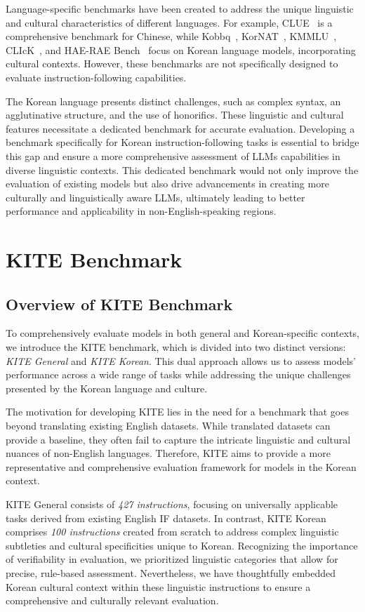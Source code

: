     Language-specific benchmarks have been created to address the unique linguistic and cultural characteristics of different languages. For example, CLUE~\cite{xu2020clue} is a comprehensive benchmark for Chinese, while Kobbq~\cite{jin2023kobbq}, KorNAT~\cite{lee2024kornat}, KMMLU~\cite{son2024kmmlu}, CLIcK~\cite{kim2024click}, and HAE-RAE Bench~\cite{son2023hae} focus on Korean language models, incorporating cultural contexts. However, these benchmarks are not specifically designed to evaluate instruction-following capabilities.

    The Korean language presents distinct challenges, such as complex syntax, an agglutinative structure, and the use of honorifics. These linguistic and cultural features necessitate a dedicated benchmark for accurate evaluation. Developing a benchmark specifically for Korean instruction-following tasks is essential to bridge this gap and ensure a more comprehensive assessment of LLMs capabilities in diverse linguistic contexts. This dedicated benchmark would not only improve the evaluation of existing models but also drive advancements in creating more culturally and linguistically aware LLMs, ultimately leading to better performance and applicability in non-English-speaking regions.

    \section{KITE Benchmark}
    \subsection{Overview of KITE Benchmark}
    To comprehensively evaluate models in both general and Korean-specific contexts, we introduce the KITE benchmark, which is divided into two distinct versions: \textit{KITE General} and \textit{KITE Korean}. This dual approach allows us to assess models' performance across a wide range of tasks while addressing the unique challenges presented by the Korean language and culture.

    The motivation for developing KITE lies in the need for a benchmark that goes beyond translating existing English datasets. While translated datasets can provide a baseline, they often fail to capture the intricate linguistic and cultural nuances of non-English languages. Therefore, KITE aims to provide a more representative and comprehensive evaluation framework for models in the Korean context.

    KITE General consists of \textit{427 instructions}, focusing on universally applicable tasks derived from existing English IF datasets. In contrast, KITE Korean comprises \textit{100 instructions} created from scratch to address complex linguistic subtleties and cultural specificities unique to Korean. Recognizing the importance of verifiability in evaluation, we prioritized linguistic categories that allow for precise, rule-based assessment. Nevertheless, we have thoughtfully embedded Korean cultural context within these linguistic instructions to ensure a comprehensive and culturally relevant evaluation.

